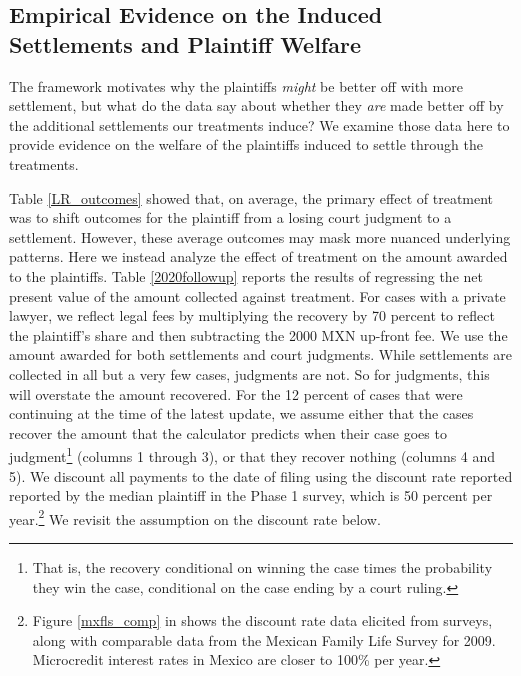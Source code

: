 \documentclass[11pt, a4paper]{article}
\begin{document}


\subsection{Empirical Evidence on the Induced Settlements and Plaintiff Welfare}

  The framework motivates why the plaintiffs \textit{might} be better off with more settlement, but what do the data say about whether they \textit{are} made better off by the additional settlements our treatments induce? We examine those data here to provide evidence on the welfare of the plaintiffs induced to settle through the treatments. 
  
  Table \ref{LR_outcomes} showed that, on average, the primary effect of treatment was to shift outcomes for the plaintiff from a losing court judgment to a settlement. However, these average outcomes may mask more nuanced underlying patterns. Here we instead analyze the effect of treatment on the amount awarded to the plaintiffs. Table \ref{2020followup} reports the results of regressing the net present value of the amount collected against treatment. For cases with a private lawyer, we reflect legal fees by multiplying the recovery by 70 percent to reflect the plaintiff's share and then subtracting the 2000 MXN up-front fee. We use the amount awarded for both settlements and court judgments. While settlements are collected in all but a very few cases, judgments are not. So for judgments, this will overstate the amount recovered. For the 12 percent of cases that were continuing at the time of the latest update, we assume either that the cases recover the amount that the calculator predicts when their case goes to judgment\footnote{That is, the recovery conditional on winning the case times the probability they win the case, conditional on the case ending by a court ruling.} (columns 1 through 3), or that they recover nothing (columns 4 and 5). We discount all payments to the date of filing using the discount rate reported reported by the median plaintiff in the Phase 1 survey, which is 50 percent per year.\footnote{Figure \ref{mxfls_comp} in  shows the discount rate data elicited from surveys, along with comparable data from the Mexican Family Life Survey for 2009. Microcredit interest rates in Mexico are closer to 100\% per year.} We revisit the assumption on the discount rate below.  
  
\end{document}
